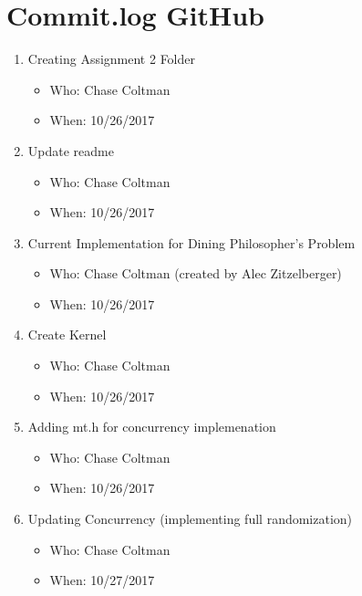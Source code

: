 \documentclass[journal,10pt,onecolumn,compsoc]{IEEEtran} \usepackage[margin=1.0in]{geometry} \usepackage{pdfpages}
\begin{document}
 
\section{Commit.log GitHub}
\begin {enumerate}
	\item Creating Assignment 2 Folder
	\begin {itemize}
        \item Who: Chase Coltman
        \item When: 10/26/2017
	\end {itemize}
    
    \item Update readme
	\begin {itemize}
        \item Who: Chase Coltman
        \item When: 10/26/2017
	\end {itemize}
    
    \item Current Implementation for Dining Philosopher's Problem
	\begin {itemize}
        \item Who: Chase Coltman (created by Alec Zitzelberger)
        \item When: 10/26/2017
	\end {itemize}
    
    \item Create Kernel
	\begin {itemize}
        \item Who: Chase Coltman
        \item When: 10/26/2017
	\end {itemize}
    
    \item Adding mt.h for concurrency implemenation
	\begin {itemize}
        \item Who: Chase Coltman
        \item When: 10/26/2017
	\end {itemize}
    
    \item Updating Concurrency (implementing full randomization)
	\begin {itemize}
        \item Who: Chase Coltman
        \item When: 10/27/2017
	\end {itemize}
    

\end{enumerate}
\end{document}
